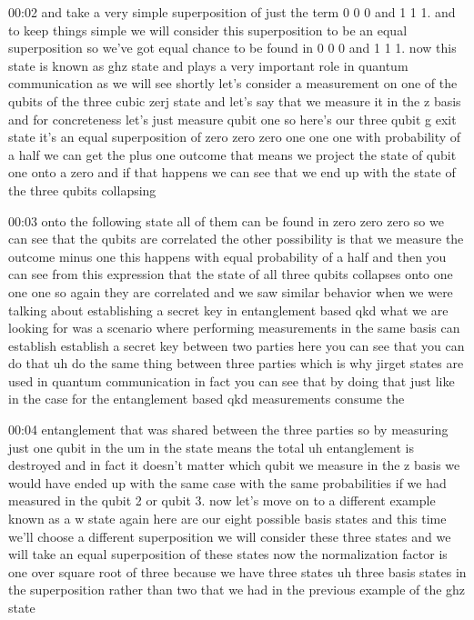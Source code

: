 00:02
and take a very simple superposition of just the term 0 0 0 and 1
1 1. and to keep things simple we will consider this superposition to be an
equal superposition so we've got equal chance to be found in 0 0 0 and 1 1 1.
now this state is known as ghz state and plays a very important role in
quantum communication as we will see shortly
let's consider a measurement on one of the qubits of the three cubic zerj state
and let's say that we measure it in the z basis
and for concreteness let's just measure qubit one
so here's our three qubit g exit state it's an equal superposition of zero zero
zero one one one with probability of a half we can get the plus one outcome that
means we project the state of qubit one onto a zero and if that happens
we can see that we end up with the state of the three qubits collapsing

00:03
onto the following state all of them can be found in zero
zero zero so we can see that the qubits are correlated
the other possibility is that we measure the outcome minus one
this happens with equal probability of a half and then you can see from this
expression that the state of all three qubits collapses
onto one one one so again they are correlated and we saw similar
behavior when we were talking about establishing a secret
key in entanglement based qkd what we are looking for was a scenario
where performing measurements in the same basis can establish
establish a secret key between two parties here you can see that you can
do that uh do the same thing between three parties which is why
jirget states are used in quantum communication
in fact you can see that by doing that just like in the case for the
entanglement based qkd measurements consume the

00:04
entanglement that was shared between the three parties
so by measuring just one qubit in the um in the state means the total
uh entanglement is destroyed and in fact it doesn't matter which
qubit we measure in the z basis we would have ended up with the same
case with the same probabilities if we had measured in the qubit 2 or qubit
3. now let's move on to a different example known as a w
state again here are our eight possible basis states and this time
we'll choose a different superposition we will consider these three states
and we will take an equal superposition of these states
now the normalization factor is one over square root of three
because we have three states uh three basis states in the superposition
rather than two that we had in the previous example of the ghz state

